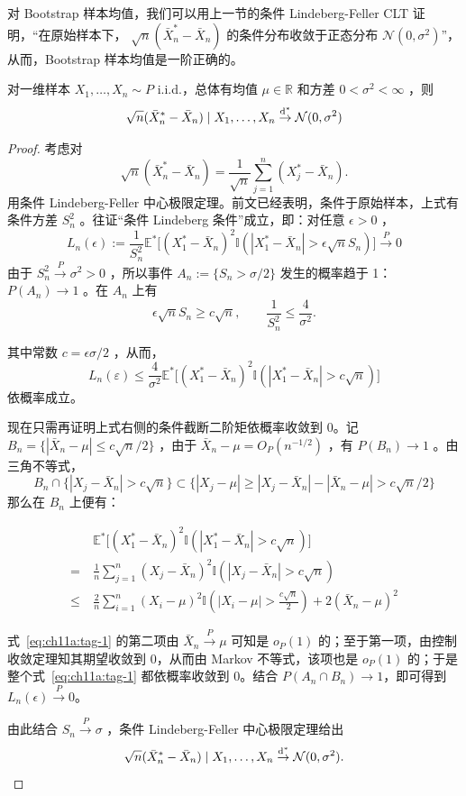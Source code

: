 对 Bootstrap 样本均值，我们可以用上一节的条件 Lindeberg-Feller CLT 证明，``在原始样本下， $\sqrt{n}(\bar{X}_n^*-\bar{X}_n)$ 的条件分布收敛于正态分布 $\mathcal N(0,\sigma^2)$''，从而，Bootstrap 样本均值是一阶正确的。

\begin{theorem}
\label{thm:ch11:bootstrap-mean-clt}

对一维样本 $X_1,\ldots,X_n\sim P$ i.i.d.，总体有均值 $\mu\in\mathbb R$ 和方差 $0<\sigma^2<\infty$ ，则
\[\sqrt{n}(\bar{X}_n^*-\bar{X}_n) \mid X_1,\ldots,X_n \overset{\rm d^*}\to \mathcal{N}(0,\sigma^2)\]
\end{theorem}

\begin{proof}

考虑对
\[
\sqrt{n}(\bar{X}_n^*-\bar{X}_n) = \frac{1}{\sqrt{n}}\sum_{j=1}^n(X_j^*-\bar{X}_n).
\]
用条件 Lindeberg-Feller 中心极限定理。前文已经表明，条件于原始样本，上式有条件方差 $S^2_n$ 。往证``条件 Lindeberg 条件''成立，即：对任意 $\epsilon>0$ ，
\[L_n(\epsilon):=\frac{1}{S^2_n}\mathbb{E}^*\!\Big[ (X_1^*-\bar{X}_n)^2 \mathbb{I} \left( |X_1^*-\bar{X}_n|>\epsilon\sqrt{n}S_n \right) \Big] \overset{P}\to 0\]
由于 $S^2_n\overset{P}\to \sigma^2>0$ ，所以事件 $A_n:=\{S_n>\sigma/2\}$ 发生的概率趋于 1： $P(A_n)\to 1$ 。在 $A_n$ 上有
\[
\epsilon\sqrt{n}S_n\geq c\sqrt n, \qquad \frac{1}{S_n^2}\leq\frac{4}{\sigma^2}.
\]

其中常数 $c=\epsilon\sigma/2$ ，从而，
\[L_n(\varepsilon) \leq \frac 4{\sigma^2} \mathbb{E}^*\!\Big[ (X_1^*-\bar{X}_n)^2 \mathbb{I}(|X_1^*-\bar{X}_n|>c\sqrt{n}) \Big]\]
依概率成立。

现在只需再证明上式右侧的条件截断二阶矩依概率收敛到 0。记 $B_n=\{|\bar{X}_n-\mu|\leq c\sqrt n/2\}$ ，由于 $\bar X_n-\mu=O_P(n^{-1/2})$ ，有 $P(B_n)\to 1$ 。由三角不等式，
\[ B_n\cap \{|X_j-\bar X_n|>c\sqrt n\}\subset \big\{|X_j-\mu| \geq |X_j-\bar{X}_n|-|\bar{X}_n-\mu| > c\sqrt n/2\big\} \]那么在 $B_n$ 上便有：

\begin{equation}
\label{eq:ch11a:tag-1}
\begin{aligned} & \mathbb{E}^*\!\Big[ (X_1^*-\bar{X}_n)^2 \mathbb{I}(|X_1^*-\bar{X}_n|>c\sqrt{n}) \Big]\\ =\ &\frac{1}{n}\sum_{j=1}^n (X_j-\bar{X}_n)^2 \mathbb I(|X_j-\bar{X}_n|>c\sqrt{n})\\ \le\ & \frac{2}{n}\sum_{i=1}^n(X_i-\mu)^2\mathbb{I}\left(|X_i-\mu|>\frac{c\sqrt{n}}{2}\right)+2(\bar{X}_n-\mu)^2 \end{aligned}
\end{equation}

式~\eqref{eq:ch11a:tag-1} 的第二项由 $\bar X_n\overset{P}\to \mu$ 可知是 $o_P(1)$ 的；至于第一项，由控制收敛定理知其期望收敛到 0，从而由 Markov 不等式，该项也是 $o_P(1)$ 的；于是整个式~\eqref{eq:ch11a:tag-1} 都依概率收敛到 0。结合 $P(A_n\cap B_n)\to1$，即可得到 $L_n(\epsilon)\overset{P}\to0$。

由此结合 $S_n\overset{P}\to\sigma$ ，条件 Lindeberg-Feller 中心极限定理给出
\[
\sqrt n(\bar X_n^*-\bar X_n) \mid X_1,\ldots,X_n \overset{\rm d^*}\to \mathcal{N}(0,\sigma^2).
\]

\end{proof}

